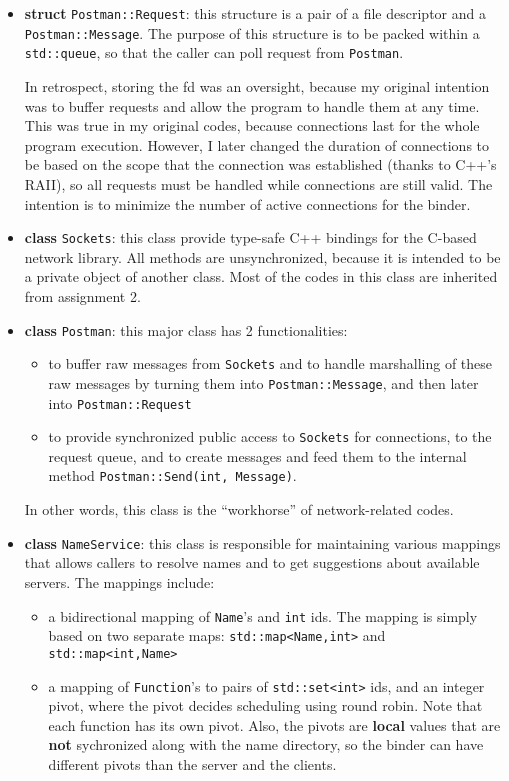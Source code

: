 \begin{itemize}
\item
{\bf struct} {\tt Postman::Request}: this structure is a pair of a file descriptor and a {\tt Postman::Message}.
The purpose of this structure is to be packed within a {\tt std::queue}, so that the caller can poll request from {\tt Postman}.

In retrospect, storing the fd was an oversight, because my original intention was to buffer requests and allow the program to handle them at any time.
This was true in my original codes, because connections last for the whole program execution.
However, I later changed the duration of connections to be based on the scope that the connection was established (thanks to C++'s RAII), so all requests must be handled while connections are still valid.
The intention is to minimize the number of active connections for the binder.

\item
{\bf class} {\tt Sockets}: this class provide type-safe C++ bindings for the C-based network library.
All methods are unsynchronized, because it is intended to be a private object of another class.
Most of the codes in this class are inherited from assignment 2.

\item
{\bf class} {\tt Postman}: this major class has 2 functionalities:
\begin{itemize}
\item
to buffer raw messages from {\tt Sockets} and to handle marshalling of these raw messages by turning them into {\tt Postman::Message}, and then later into {\tt Postman::Request}
\item
to provide synchronized public access to {\tt Sockets} for connections, to the request queue, and to create messages and feed them to the internal method {\tt Postman::Send(int, Message)}.
\end{itemize}

In other words, this class is the ``workhorse'' of network-related codes.

\item
{\bf class} {\tt NameService}: this class is responsible for maintaining various mappings that allows callers to resolve names and to get suggestions about available servers.
The mappings include:
\begin{itemize}
\item
a bidirectional mapping of {\tt Name}'s and {\tt int} ids.
The mapping is simply based on two separate maps: {\tt std::map<Name,int>} and {\tt std::map<int,Name>}
\item
a mapping of {\tt Function}'s to pairs of {\tt std::set<int>} ids, and an integer pivot, where the pivot decides scheduling using round robin.
Note that each function has its own pivot.
Also, the pivots are {\bf local} values that are {\bf not} sychronized along with the name directory, so the binder can have different pivots than the server and the clients.
\end{itemize}


\end{itemize}
